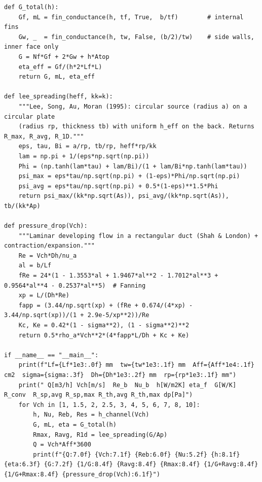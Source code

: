 \documentclass[11pt,a4paper]{article}
\begin{document}
\begin{lstlisting}
def G_total(h):
    Gf, mL = fin_conductance(h, tf, True,  b/tf)        # internal fins
    Gw, _  = fin_conductance(h, tw, False, (b/2)/tw)    # side walls, inner face only
    G = Nf*Gf + 2*Gw + h*Atop
    eta_eff = Gf/(h*2*Lf*L)
    return G, mL, eta_eff

def lee_spreading(heff, kk=k):
    """Lee, Song, Au, Moran (1995): circular source (radius a) on a circular plate
    (radius rp, thickness tb) with uniform h_eff on the back. Returns R_max, R_avg, R_1D."""
    eps, tau, Bi = a/rp, tb/rp, heff*rp/kk
    lam = np.pi + 1/(eps*np.sqrt(np.pi))
    Phi = (np.tanh(lam*tau) + lam/Bi)/(1 + lam/Bi*np.tanh(lam*tau))
    psi_max = eps*tau/np.sqrt(np.pi) + (1-eps)*Phi/np.sqrt(np.pi)
    psi_avg = eps*tau/np.sqrt(np.pi) + 0.5*(1-eps)**1.5*Phi
    return psi_max/(kk*np.sqrt(As)), psi_avg/(kk*np.sqrt(As)), tb/(kk*Ap)

def pressure_drop(Vch):
    """Laminar developing flow in a rectangular duct (Shah & London) + contraction/expansion."""
    Re = Vch*Dh/nu_a
    al = b/Lf
    fRe = 24*(1 - 1.3553*al + 1.9467*al**2 - 1.7012*al**3 + 0.9564*al**4 - 0.2537*al**5)  # Fanning
    xp = L/(Dh*Re)
    fapp = (3.44/np.sqrt(xp) + (fRe + 0.674/(4*xp) - 3.44/np.sqrt(xp))/(1 + 2.9e-5/xp**2))/Re
    Kc, Ke = 0.42*(1 - sigma**2), (1 - sigma**2)**2
    return 0.5*rho_a*Vch**2*(4*fapp*L/Dh + Kc + Ke)

if __name__ == "__main__":
    print(f"Lf={Lf*1e3:.0f} mm  tw={tw*1e3:.1f} mm  Aff={Aff*1e4:.1f} cm2  sigma={sigma:.3f}  Dh={Dh*1e3:.2f} mm  rp={rp*1e3:.1f} mm")
    print(" Q[m3/h] Vch[m/s]  Re_b  Nu_b  h[W/m2K] eta_f  G[W/K]  R_conv  R_sp,avg R_sp,max R_th,avg R_th,max dp[Pa]")
    for Vch in [1, 1.5, 2, 2.5, 3, 4, 5, 6, 7, 8, 10]:
        h, Nu, Reb, Res = h_channel(Vch)
        G, mL, eta = G_total(h)
        Rmax, Ravg, R1d = lee_spreading(G/Ap)
        Q = Vch*Aff*3600
        print(f"{Q:7.0f} {Vch:7.1f} {Reb:6.0f} {Nu:5.2f} {h:8.1f} {eta:6.3f} {G:7.2f} {1/G:8.4f} {Ravg:8.4f} {Rmax:8.4f} {1/G+Ravg:8.4f} {1/G+Rmax:8.4f} {pressure_drop(Vch):6.1f}")
\end{lstlisting}
\end{document}

